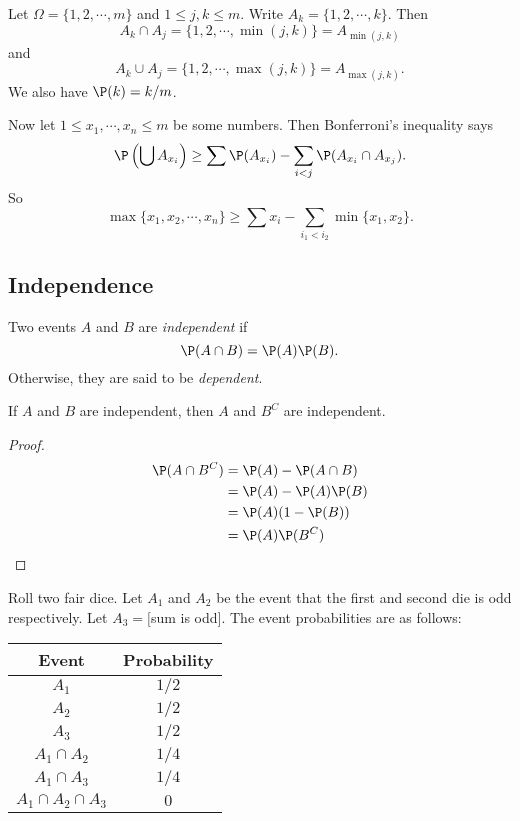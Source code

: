\documentclass[a4paper]{article}
\begin{document}
\begin{eg}
  Let $\Omega = \{1, 2, \cdots, m\}$ and $1 \leq j, k \leq m$. Write $A_k = \{1, 2, \cdots, k\}$. Then 
  \[
    A_k \cap A_j = \{1, 2, \cdots, \min(j, k)\} = A_{\min(j, k)}
  \]
  and 
  \[
    A_k \cup A_j = \{1, 2, \cdots, \max(j, k)\} = A_{\max(j, k)}.
  \]
  We also have $\P(k) = k/m$.
  
  Now let $1 \leq x_1, \cdots, x_n \leq m$ be some numbers. Then Bonferroni's inequality says
  \[
    \P\left(\bigcup A_{x_{i}}\right) \geq \sum \P(A_{x_i}) - \sum_{i < j} \P(A_{x_i}\cap A_{x_j}).
  \]
  So 
  \[
    \max\{x_1, x_2, \cdots, x_n\} \geq \sum x_i - \sum_{i_1 < i_2} \min\{x_1, x_2\}.
  \]
\end{eg}

\subsection{Independence}
\begin{defi}
  Two events $A$ and $B$ are \emph{independent} if
  \[
    \P(A\cap B) = \P(A)\P(B).
  \]
  Otherwise, they are said to be \emph{dependent}.
\end{defi}

\begin{prop}
  If $A$ and $B$ are independent, then $A$ and $B^C$ are independent.
\end{prop}

\begin{proof}
  \begin{align*}
    \P(A\cap B^C) &= \P(A) - \P(A\cap B)\\
    &= \P(A) - \P(A)\P(B)\\
    &= \P(A)(1 - \P(B))\\
    &= \P(A)\P(B^C)
  \end{align*}
\end{proof}

\begin{eg}
  Roll two fair dice. Let $A_1$ and $A_2$ be the event that the first and second die is odd respectively. Let $A_3 = [$sum is odd$]$. The event probabilities are as follows:
  \begin{center}
    \begin{tabular}{cc}
      \toprule
      Event & Probability\\
      \midrule
      $A_1$ & $1/2$\\
      $A_2$ & $1/2$\\
      $A_3$ & $1/2$\\
      $A_1\cap A_2$ & $1/4$\\
      $A_1\cap A_3$ & $1/4$\\
      $A_1\cap A_2\cap A_3$ & $0$\\
      \bottomrule
    \end{tabular}
  \end{center}
\end{eg}
\end{document}
